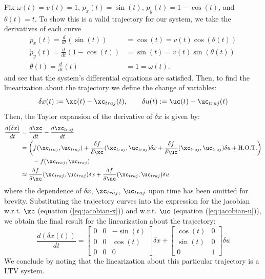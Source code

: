 \documentclass{homework}
\begin{document}
\begin{letterenum}
    \item Fix $\omega(t) = v(t) = 1$, $p_x(t) = \sin(t)$,
    $p_y(t) = 1 - \cos(t)$, and $\theta(t) = t$.
    To show this is a valid trajectory for our system, we take the 
    derivatives of each curve
    \begin{align}
        \dot{p}_x(t) = \frac{d}{dt}(\sin(t)) &= \cos(t) = v(t) \cos(\theta(t)) \\
        \dot{p}_y(t) = \frac{d}{dt}(1 - \cos(t)) &= \sin(t) = v(t) \sin(\theta(t)) \\
        \dot{\theta}(t) = \frac{d}{dt}(t) &= 1 = \omega(t).
    \end{align}
    and see that the system's differential equations are satisfied. Then,
    to find the linearization about the trajectory we define the change of variables:
    \begin{equation}
        \delta x(t) := \xc(t) - \xc_{traj}(t), \qquad \delta u(t) := \uc(t) - \uc_{traj}(t)
    \end{equation}
    Then, the Taylor expansion of the derivative of $\delta x$ is given by:
    \begin{align}
        \frac{d(\delta x)}{dt} &= \frac{d\xc}{dt} - \frac{d\xc_{traj}}{dt} \\
            &= \biggl(f(\xc_{traj}, \uc_{traj})
                + \frac{\delta f}{\delta \xc} (\xc_{traj}, \uc_{traj}) \delta x
                + \frac{\delta f}{\delta \uc} (\xc_{traj}, \uc_{traj}) \delta u
                + \text{H.O.T.}
                \biggr) \\ & \qquad - f(\xc_{traj}, \uc_{traj}) \\
            &\approx \frac{\delta f}{\delta \xc} (\xc_{traj}, \uc_{traj}) \delta x
                + \frac{\delta f}{\delta \uc} (\xc_{traj}, \uc_{traj}) \delta u
    \end{align}
    where the dependence of $\delta x$, $\xc_{traj}$, $\uc_{traj}$ upon time has
    been omitted for brevity.
    Substituting the trajectory curves into the expression for the jacobian w.r.t. 
    $\xc$ (equation (\ref{eq:jacobian-x})) and
    w.r.t. $\uc$ (equation (\ref{eq:jacobian-u})), we obtain the final result
    for the linearization about the trajectory:
    \begin{equation}
        \boxed{\frac{d(\delta x(t))}{dt} = \begin{bmatrix}
            0 & 0 & -\sin(t) \\
            0 & 0 & \cos(t) \\
            0 & 0 & 0
        \end{bmatrix} \delta x + \begin{bmatrix}
            \cos(t) & 0 \\
            \sin(t) & 0 \\
            0 & 1
        \end{bmatrix} \delta u}
    \end{equation}
    We conclude by noting that the linearization about this particular trajectory
    is a LTV system.
\end{letterenum}
\end{document}
